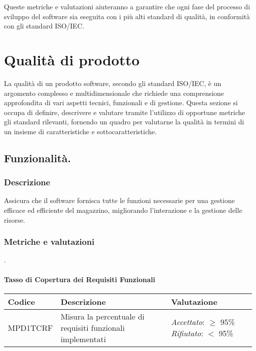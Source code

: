 Queste metriche e valutazioni aiuteranno a garantire che ogni fase del processo di sviluppo del software sia eseguita con i più alti standard di qualità, in conformità con gli standard ISO/IEC.

\newpage
\section{Qualità di prodotto}
La qualità di un prodotto software, secondo gli standard ISO/IEC, è un argomento complesso e multidimensionale che richiede una comprensione approfondita di vari aspetti tecnici, funzionali e di gestione. Questa sezione si occupa di definire, descrivere e valutare tramite l'utilizzo di opportune metriche gli standard rilevanti, fornendo un quadro per valutarne la qualità in termini di un insieme di caratteristiche e sottocaratteristiche.

\subsection{Funzionalità.}
\subsubsection{Descrizione} Assicura che il software fornisca tutte le funzioni necessarie per una gestione efficace ed efficiente del magazzino, migliorando l'interazione e la gestione delle risorse.\\
\subsubsection{Metriche e valutazioni}.

\paragraph{Tasso di Copertura dei Requisiti Funzionali}

\begin{table}[h]
\centering
\begin{tabular}{ |>{\centering\arraybackslash}m{3cm}|>{\centering\arraybackslash}m{10cm}|>{\centering\arraybackslash}m{3cm}| }
\hline
Codice & Descrizione & Valutazione\\
\hline
MPD1TCRF & Misura la percentuale di requisiti funzionali implementati &
\textit{Accettato}: $\geq$ 95\%
\textit{Rifiutato}: $<$ 95\% \\
\hline
\end{tabular}
\end{table}



